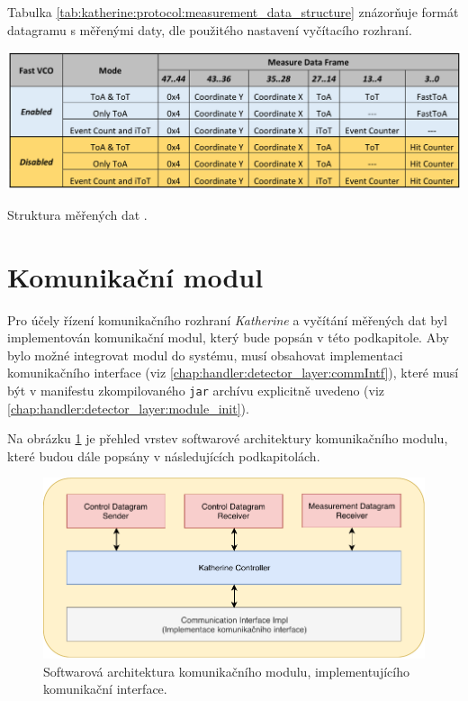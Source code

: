 Tabulka \ref{tab:katherine:protocol:measurement_data_structure} znázorňuje formát datagramu s měřenými daty, dle použitého nastavení vyčítacího rozhraní.

\begin{table}[h!]
    \begin{center}
        \includegraphics[width=14cm]{figures/katherine_pixel_measurement_data.png}
        \caption{Struktura měřených dat \cite{katherine_docs}.}
        \label{tab:katherine:protocol:measurement_data_structure}
    \end{center}
\end{table}

\section{Komunikační modul}\label{chap:katherine:comm}
Pro účely řízení komunikačního rozhraní \textit{Katherine} a vyčítání měřených dat byl implementován komunikační modul, který bude popsán v této podkapitole. Aby bylo možné integrovat modul do systému, musí obsahovat implementaci komunikačního interface (viz \ref{chap:handler:detector_layer:commIntf}), které musí být v manifestu zkompilovaného \texttt{jar} archívu explicitně uvedeno (viz \ref{chap:handler:detector_layer:module_init}).

Na obrázku \ref{fig:katherine:comm:arch} je přehled vrstev softwarové architektury komunikačního modulu, které budou dále popsány v následujících podkapitolách.

\begin{figure}[h]
	\begin{center}
		\includegraphics[width=14cm]{figures/katherine_comm_arch.pdf}
		\caption{Softwarová architektura komunikačního modulu, implementujícího komunikační interface.}
		\label{fig:katherine:comm:arch}
	\end{center}
\end{figure}

